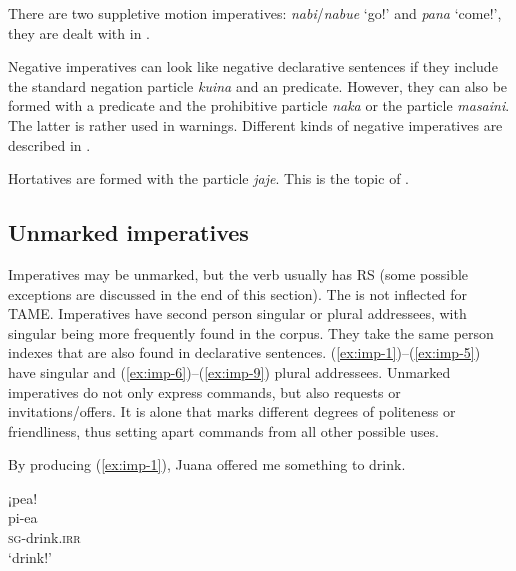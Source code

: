 There are two suppletive motion imperatives: \textit{nabi}/\textit{nabue} ‘go!’ and \textit{pana} ‘come!’, they are dealt with in . 

Negative imperatives can look like negative declarative sentences if they include the standard negation particle \textit{kuina} and an  predicate. However, they can also be formed with a  predicate and the prohibitive particle \textit{naka} or the  particle \textit{masaini}. The latter is rather used in warnings. Different kinds of negative imperatives are described in .

Hortatives are formed with the  particle \textit{jaje}. This is the topic of .



\subsection{Unmarked imperatives}\label{sec:UnmarkedImperatives}

Imperatives may be unmarked, but the verb usually has  RS (some possible exceptions are discussed in the end of this section). The  is not inflected for TAME. Imperatives have second person singular or plural addressees, with singular being more frequently found in the corpus. They take the same person indexes that are also found in declarative sentences. (\ref{ex:imp-1})--(\ref{ex:imp-5}) have singular and (\ref{ex:imp-6})--(\ref{ex:imp-9}) plural addressees. Unmarked imperatives do not only express commands, but also requests or invitations/offers. It is  alone that marks different degrees of politeness or friendliness, thus setting apart commands from all other possible uses.

By producing (\ref{ex:imp-1}), Juana offered me something to drink.

\ea\label{ex:imp-1}
\begingl
\glpreamble ¡pea!\\
\gla pi-ea\\
\textsc{sg}-drink.\textsc{irr}\\
\glft ‘drink!’
\endgl
\trailingcitation{[jxx-p150920l.002]}
\xe

